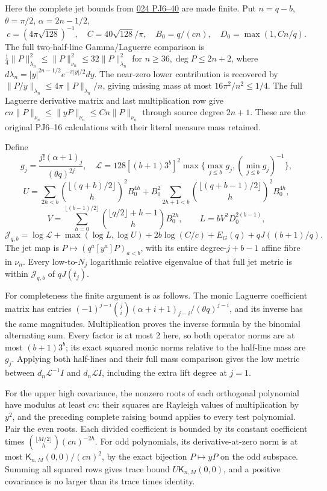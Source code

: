 \documentclass[10pt]{article}
\begin{document}
Here the complete jet bounds from \href{https://github.com/KokunoYumeto/zeta-function-research-reader/blob/1447462732b40b1474bd9a819cf79257f5326ada/workbenches/splitzero-tandem/continuations/20260922-kernel-frequency/POWER_JET_PROOF.md}{024 PJ6--40} are made finite. Put \(n=q-b\), \(\theta=\pi/2\), \(\alpha=2n-1/2\), \[
c=(4\pi\sqrt{128})^{-1},\quad C=40\sqrt{128}/\pi,
\quad B_0=q/(cn),\quad D_0=\max(1,Cn/q).
\] The full two-half-line Gamma/Laguerre comparison is \(\tfrac14\|P\|_{\lambda_n}^2\le\|P\|_{\nu_n}^2\le32\|P\|_{\lambda_n}^2\) for \(n\ge36,\deg P\le2n+2\), where \(d\lambda_n=|y|^{2n-1/2}e^{-\pi|y|/2}dy\). The near-zero lower contribution is recovered by \(\|P/y\|_{\lambda_n}\le4\pi\|P\|_{\lambda_n}/n\), giving missing mass at most \(16\pi^2/n^2\le1/4\). The full Laguerre derivative matrix and last multiplication row give \(cn\|P\|_{\nu_n}\le\|yP\|_{\nu_n}\le Cn\|P\|_{\nu_n}\) through source degree \(2n+1\). These are the original PJ6--16 calculations with their literal measure mass retained.

Define \[
g_j=\frac{j!(\alpha+1)_j}{(\theta q)^{2j}},\quad
\mathcal L=128[(b+1)3^b]^2\max\{\max_{j\le b}g_j,(\min_{j\le b}g_j)^{-1}\},
\] \[
U=\sum_{2h<b}\binom{\lfloor(q+b)/2\rfloor}{h}^{2}B_0^{4h}
+B_0^2\sum_{2h+1<b}\binom{\lfloor(q+b-1)/2\rfloor}{h}^{2}B_0^{4h},
\] \[
V=\sum_{h=0}^{\lfloor(b-1)/2\rfloor}
\binom{\lfloor q/2\rfloor+h-1}{h}B_0^{2h},\qquad
L=bV^2D_0^{2(b-1)},
\] \[
\mathcal J_{q,b}=\log\mathcal L+\max(\log L,\log U)
+2b\log(C/c)+E_G(q)+qJ((b+1)/q).
\tag{LX27}
\] The jet map is \(P\mapsto(q^a[y^a]P)_{a<b}\), with its entire degree-\(j+b-1\) affine fibre in \(\nu_n\). Every low-to-\(N_j\) logarithmic relative eigenvalue of that full jet metric is within \(\mathcal J_{q,b}\) of \(qJ(t_j)\).

For completeness the finite argument is as follows. The monic Laguerre coefficient matrix has entries \((-1)^{j-i}\binom ji(\alpha+i+1)_{j-i}/(\theta q)^{j-i}\), and its inverse has the same magnitudes. Multiplication proves the inverse formula by the binomial alternating sum. Every factor is at most 2 here, so both operator norms are at most \((b+1)3^b\); its exact squared monic norms relative to the half-line mass are \(g_j\). Applying both half-lines and their full mass comparison gives the low metric between \(d_n\mathcal L^{-1}I\) and \(d_n\mathcal LI\), including the extra lift degree at \(j=1\).

For the upper high covariance, the nonzero roots of each orthogonal polynomial have modulus at least \(cn\): their squares are Rayleigh values of multiplication by \(y^2\), and the preceding complete raising bound applies to every test polynomial. Pair the even roots. Each divided coefficient is bounded by its constant coefficient times \(\binom{\lfloor M/2\rfloor}h(cn)^{-2h}\). For odd polynomials, its derivative-at-zero norm is at most \(\mathsf K_{n,M}(0,0)/(cn)^2\), by the exact bijection \(P\mapsto yP\) on the odd subspace. Summing all squared rows gives trace bound \(U\mathsf K_{n,M}(0,0)\), and a positive covariance is no larger than its trace times identity.
\end{document}
